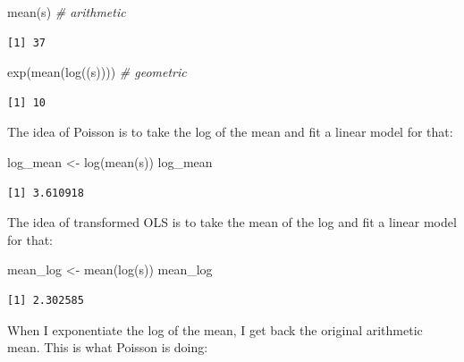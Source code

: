 \documentclass[
  letterpaper,
  DIV=11,
  numbers=noendperiod]{scrreprt}
\newenvironment{Shaded}{\begin{snugshade}}{\end{snugshade}}
\newcommand{\CommentTok}[1]{\textcolor[rgb]{0.38,0.63,0.69}{\textit{#1}}}
\newcommand{\FunctionTok}[1]{\textcolor[rgb]{0.02,0.16,0.49}{#1}}
\newcommand{\NormalTok}[1]{\textcolor[rgb]{0.00,0.44,0.13}{#1}}
\newcommand{\OtherTok}[1]{\textcolor[rgb]{0.00,0.44,0.13}{#1}}
\begin{document}
\begin{Shaded}
\begin{Highlighting}[]
\FunctionTok{mean}\NormalTok{(s) }\CommentTok{\# arithmetic}
\end{Highlighting}
\end{Shaded}

\begin{verbatim}
[1] 37
\end{verbatim}

\begin{Shaded}
\begin{Highlighting}[]
\FunctionTok{exp}\NormalTok{(}\FunctionTok{mean}\NormalTok{(}\FunctionTok{log}\NormalTok{((s)))) }\CommentTok{\# geometric}
\end{Highlighting}
\end{Shaded}

\begin{verbatim}
[1] 10
\end{verbatim}

The idea of Poisson is to take the log of the mean and fit a linear
model for that:

\begin{Shaded}
\begin{Highlighting}[]
\NormalTok{log\_mean }\OtherTok{\textless{}{-}} \FunctionTok{log}\NormalTok{(}\FunctionTok{mean}\NormalTok{(s))}
\NormalTok{log\_mean}
\end{Highlighting}
\end{Shaded}

\begin{verbatim}
[1] 3.610918
\end{verbatim}

The idea of transformed OLS is to take the mean of the log and fit a
linear model for that:

\begin{Shaded}
\begin{Highlighting}[]
\NormalTok{mean\_log }\OtherTok{\textless{}{-}} \FunctionTok{mean}\NormalTok{(}\FunctionTok{log}\NormalTok{(s))}
\NormalTok{mean\_log}
\end{Highlighting}
\end{Shaded}

\begin{verbatim}
[1] 2.302585
\end{verbatim}

When I exponentiate the log of the mean, I get back the original
arithmetic mean. This is what Poisson is doing:
\end{document}
